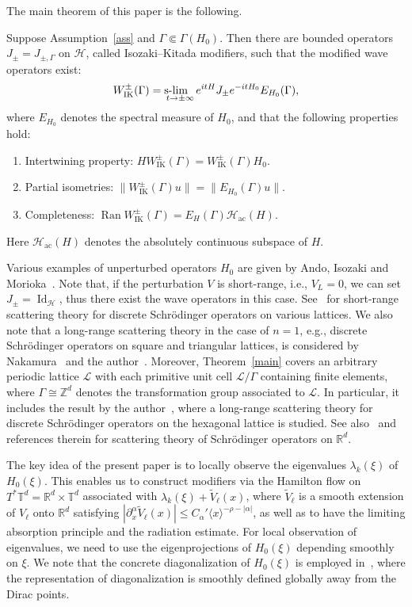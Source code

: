 \documentclass[AHL,Unicode,longabstracts,published]{cedram}
\newcommand{\slim}{\operatorname{s-}\hspace{-0.25cm}\lim_{t\to\pm\infty}}
\newcommand{\Schr}{Schr\"odinger }
\renewcommand{\a}{\alpha}
\newcommand{\x}{\xi}
\newcommand{\R}{\mathbb{R}}
\newcommand{\Z}{\mathbb{Z}}
\newcommand{\T}{\mathbb{T}}
\newcommand{\HS}{\mathcal{H}}
\newcommand{\LS}{\mathcal{L}}
\newcommand{\ac}{\mathrm{ac}}
\newcommand{\IK}{\mathrm{IK}}
\newcommand{\la}{\langle}
\newcommand{\ra}{\rangle}
\DeclareMathOperator{\Ran}{Ran}
\DeclareMathOperator{\Idd}{Id}
\newcommand*{\relabel}{\renewcommand{\labelenumi}{(\theenumi)}}
\newcommand*{\romanenumi}{\renewcommand*{\theenumi}{\roman{enumi}}\relabel}
\newcommand{\Z}{\mathbb{Z}}
\newcommand{\R}{\mathbb{R}}
\newcommand{\HS}{\mathcal{H}}
\begin{document}
The main theorem of this paper is the following.

\begin{theo}\label{main}
Suppose Assumption~\ref{ass} and $\Gamma \Subset \Gamma(H_0)$. Then there are bounded operators $J_\pm=J_{\pm,\Gamma}$ on $\HS$, called Isozaki--Kitada modifiers, such that the modified wave operators exist:
\begin{align}\label{modified WOs}
W_{\IK}^\pm(\Gamma)=\slim e^{itH}J_\pm e^{-itH_0}E_{H_0}(\Gamma),
\end{align}
where $E_{H_0}$ denotes the spectral measure of $H_0$, and that the following properties hold:
\begin{enumerate}\romanenumi
\item Intertwining property: $H W_{\IK}^\pm(\Gamma)=W_{\IK}^\pm(\Gamma) H_0$.
\item Partial isometries: $\|W_{\IK}^\pm(\Gamma) u\|=\|E_{H_0}(\Gamma)u\|$.
\item Completeness: $\Ran W_{\IK}^\pm(\Gamma) = E_{H}(\Gamma)\HS_{\ac}(H)$.
\end{enumerate}
\noindent Here $\HS_{\ac}(H)$ denotes the absolutely continuous subspace of $H$.
\end{theo}

Various examples of unperturbed operators $H_0$ are given by Ando, Isozaki and Morioka~\cite[Section~3]{An-I-M}. Note that, if the perturbation $V$ is short-range, i.e., $V_L=0$, we can set $J_\pm=\Idd_\HS$, thus there exist the wave operators in this case. See~\cite{P-R} for short-range scattering theory for discrete \Schr operators on various lattices. We also note that a long-range scattering theory in the case of $n=1$, e.g., discrete \Schr operators on square and triangular lattices, is considered by Nakamura~\cite{N} and the author~\cite{T1}. Moreover, Theorem~\ref{main} covers an arbitrary periodic lattice $\LS$ with each primitive unit cell $\LS/\Gamma$ containing finite elements, where $\Gamma \cong \Z^d$ denotes the transformation group associated to $\LS$. In particular, it includes the result by the author~\cite{T2}, where a long-range scattering theory for discrete \Schr operators on the hexagonal lattice is studied. See also~\cite{D-G,R-S3,Y} and references therein for scattering theory of \Schr operators on $\R^d$.



The key idea of the present paper is to locally observe the eigenvalues $\lambda_{k}(\x)$ of $H_0(\x)$. This enables us to construct modifiers via the Hamilton flow on $T^*\T^d=\R^d \times \T^d$ associated with $\lambda_k(\x)+\tilde{V}_{\ell}(x)$, where $\tilde{V}_{\ell}$ is a smooth extension of $V_\ell$ onto $\R^d$ satisfying $|\partial_x^\a \tilde V_\ell(x)|\leq C_\a' \la x \ra^{-\rho-|\a|}$, as well as to have the limiting absorption principle and the radiation estimate. For local observation of eigenvalues, we need to use the eigenprojections of $H_0(\x)$ depending smoothly on $\x$. We note that the concrete diagonalization of $H_0(\x)$ is employed in~\cite{T2}, where the representation of diagonalization is smoothly defined globally away from the Dirac points.
\end{document}
